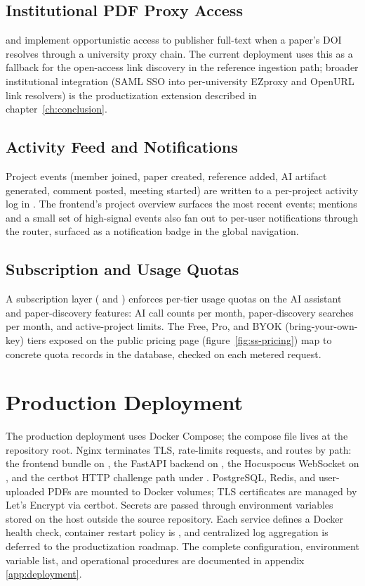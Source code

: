 \subsection{Institutional PDF Proxy Access}
 and  implement opportunistic access to publisher full-text when a paper's DOI resolves through a university proxy chain. The current deployment uses this as a fallback for the open-access link discovery in the reference ingestion path; broader institutional integration (SAML SSO into per-university EZproxy and OpenURL link resolvers) is the productization extension described in chapter~\ref{ch:conclusion}.

\subsection{Activity Feed and Notifications}
Project events (member joined, paper created, reference added, AI artifact generated, comment posted, meeting started) are written to a per-project activity log in . The frontend's project overview surfaces the most recent events; mentions and a small set of high-signal events also fan out to per-user notifications through the  router, surfaced as a notification badge in the global navigation.

\subsection{Subscription and Usage Quotas}
A subscription layer ( and ) enforces per-tier usage quotas on the AI assistant and paper-discovery features: AI call counts per month, paper-discovery searches per month, and active-project limits. The Free, Pro, and BYOK (bring-your-own-key) tiers exposed on the public pricing page (figure~\ref{fig:ss-pricing}) map to concrete quota records in the database, checked on each metered request.

\section{Production Deployment}
\label{sec:impl-deployment}

The production deployment uses Docker Compose; the compose file lives at the repository root. Nginx terminates TLS, rate-limits requests, and routes by path: the frontend bundle on \code{/}, the FastAPI backend on , the Hocuspocus WebSocket on , and the certbot HTTP challenge path under . PostgreSQL, Redis, and user-uploaded PDFs are mounted to Docker volumes; TLS certificates are managed by Let's Encrypt via certbot. Secrets are passed through environment variables stored on the host outside the source repository. Each service defines a Docker health check, container restart policy is , and centralized log aggregation is deferred to the productization roadmap. The complete configuration, environment variable list, and operational procedures are documented in appendix \ref{app:deployment}.
